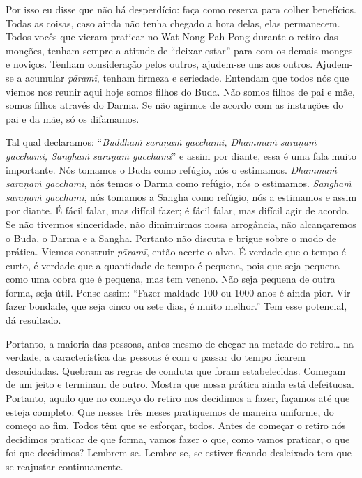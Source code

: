 Por isso eu disse que não há desperdício: faça como reserva para
colher benefícios. Todas as coisas, caso ainda não tenha chegado a hora
delas, elas permanecem. Todos vocês que vieram praticar no Wat Nong Pah
Pong durante o retiro das monções, tenham sempre a atitude de “deixar
estar” para com os demais monges e noviços. Tenham consideração pelos
outros, ajudem-se uns aos outros. Ajudem-se a acumular
\emph{pāramī}, tenham firmeza e seriedade. Entendam que todos
nós que viemos nos reunir aqui hoje somos filhos do Buda. Não somos
filhos de pai e mãe, somos filhos através do Darma. Se não agirmos de
acordo com as instruções do pai e da mãe, só os difamamos. 

Tal qual declaramos: “\emph{Buddhaṁ saraṇaṁ gacchāmi, Dhammaṁ
saraṇaṁ gacchāmi, Sanghaṁ saraṇaṁ gacchāmi}” e assim por diante,
essa é uma fala muito importante. Nós tomamos o Buda como refúgio, nós
o estimamos. \emph{Dhammaṁ saraṇaṁ gacchāmi}, nós temos o Darma
como refúgio, nós o estimamos. \emph{Sanghaṁ saraṇaṁ gacchāmi}, nós
tomamos a Sangha como refúgio, nós a estimamos e assim por diante. É
fácil falar, mas difícil fazer; é fácil falar, mas difícil agir de
acordo. Se não tivermos sinceridade, não diminuirmos nossa arrogância,
não alcançaremos o Buda, o Darma e a Sangha. Portanto não discuta e
brigue sobre o modo de prática. Viemos construir \emph{pāramī},
então acerte o alvo. É verdade que o tempo é curto, é verdade que a
quantidade de tempo é pequena, pois que seja pequena como uma cobra que
é pequena, mas tem veneno. Não seja pequena de outra forma, seja útil.
Pense assim: “Fazer maldade 100 ou 1000 anos é ainda pior. Vir fazer
bondade, que seja cinco ou sete dias, é muito melhor.” Tem esse
potencial, dá resultado. 

Portanto, a maioria das pessoas, antes mesmo de chegar na metade do
retiro\ldots{} na verdade, a característica das pessoas é com o passar do
tempo ficarem descuidadas. Quebram as regras de conduta que foram
estabelecidas. Começam de um jeito e terminam de outro. Mostra que
nossa prática ainda está defeituosa. Portanto, aquilo que no começo do
retiro nos decidimos a fazer, façamos até que esteja completo. Que
nesses três meses pratiquemos de maneira uniforme, do começo ao fim.
Todos têm que se esforçar, todos. Antes de começar o retiro nós
decidimos praticar de que forma, vamos fazer o que, como vamos
praticar, o que foi que decidimos? Lembrem-se. Lembre-se, se estiver
ficando desleixado tem que se reajustar continuamente.

